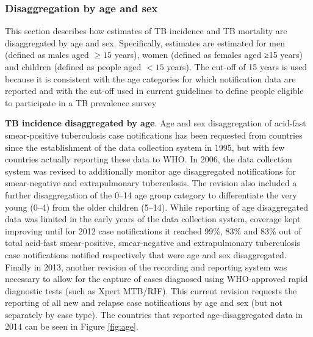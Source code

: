 \subsubsection{Disaggregation by age and sex}

This section describes how estimates of TB incidence and TB mortality are disaggregated by age and sex. Specifically, estimates are estimated for men (defined as males aged $\geq 15$ years), women (defined as females aged ≥15 years) and children (defined as people aged $<15$ years). The cut-off of 15 years is used because it is consistent with the age categories for which notification data are reported and with the cut-off used in current guidelines to define people eligible to participate in a TB prevalence survey

\textbf{TB incidence disaggregated by age}. Age and sex disaggregation of acid-fast smear-positive tuberculosis case notifications has been requested from countries since the establishment of the data collection system in 1995, but with few countries actually reporting these data to WHO. In 2006, the data collection system was revised to additionally monitor age disaggregated notifications for smear-negative and extrapulmonary tuberculosis. The revision also included a further disaggregation of the 0–14 age group category to differentiate the very young (0–4) from the older children (5–14). While reporting of age disaggregated data was limited in the early years of the data collection system, coverage kept improving until for 2012 case notifications it reached 99\%, 83\% and 83\% out of total acid-fast smear-positive, smear-negative and extrapulmonary tuberculosis case notifications notified respectively that were age and sex disaggregated. Finally in 2013, another revision of the recording and reporting system was necessary to allow for the capture of cases diagnosed using WHO-approved rapid diagnostic tests (such as Xpert MTB/RIF)\cite{Who2013-td}. This current revision requests the reporting of all new and relapse case notifications by age and sex (but not separately by case type). The countries that reported age-disaggregated data in 2014 can be seen in Figure \ref{fig:age}.


